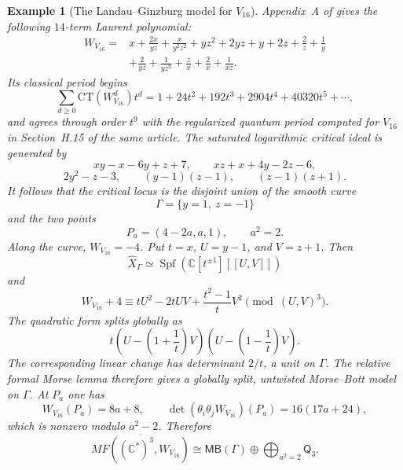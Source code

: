 \documentclass[11pt]{amsart}
\newtheorem{example}{Example}[section]
\newcommand{\MorseCat}[1]{\mathsf{Q}_{#1}}
\newcommand{\MBcat}[1]{\mathsf{MB}(#1)}
\begin{document}
\begin{example}[The Landau--Ginzburg model for $V_{16}$]
Appendix~A of \cite{CoatesCortiGalkinKasprzyk2016} gives the following
$14$-term Laurent polynomial:
\[
\begin{aligned}
W_{V_{16}}={}&x+\frac{2x}{yz}+\frac{x}{y^2z^2}
+yz^2+2yz+y+2z+\frac2z+\frac1y\\
&+\frac{2}{yz}+\frac{1}{yz^2}+\frac{z}{x}+\frac2x+\frac{1}{xz}.
\end{aligned}
\]
Its classical period begins
\[
\sum_{d\geq0}\mathrm{CT}(W_{V_{16}}^d)t^d
=1+24t^2+192t^3+2904t^4+40320t^5+\cdots,
\]
and agrees through order $t^9$ with the regularized quantum period computed
for $V_{16}$ in Section~H.15 of the same article.
The saturated logarithmic critical ideal is generated by
\[
xy-x-6y+z+7,
\qquad
xz+x+4y-2z-6,
\]
\[
2y^2-z-3,
\qquad
(y-1)(z-1),
\qquad
(z-1)(z+1).
\]
It follows that the critical locus is the disjoint union of the smooth curve
\[
\Gamma=\{y=1,\ z=-1\}
\]
and the two points
\[
P_a=(4-2a,a,1),
\qquad
a^2=2.
\]
Along the curve, $W_{V_{16}}=-4$. Put $t=x$, $U=y-1$, and $V=z+1$.
Then
\[
\widehat X_\Gamma
\simeq
\operatorname{Spf}\!\left(\mathbb C[t^{\pm1}][[U,V]]\right)
\]
and
\[
W_{V_{16}}+4
\equiv
tU^2-2tUV+\frac{t^2-1}{t}V^2
\pmod{(U,V)^3}.
\]
The quadratic form splits globally as
\[
t\left(U-\left(1+\frac1t\right)V\right)
 \left(U-\left(1-\frac1t\right)V\right).
\]
The corresponding linear change has determinant $2/t$, a unit on $\Gamma$.
The relative formal Morse lemma therefore gives a globally split, untwisted
Morse--Bott model on $\Gamma$. At $P_a$ one has
\[
W_{V_{16}}(P_a)=8a+8,
\qquad
\det(\theta_i\theta_jW_{V_{16}})(P_a)=16(17a+24),
\]
which is nonzero modulo $a^2-2$. Therefore
\[
\overline{MF((\mathbb{C}^*)^3,W_{V_{16}})}
\cong
\MBcat{\Gamma}
\oplus
\bigoplus_{a^2=2}\MorseCat{3}.
\]
\end{example}
\end{document}

